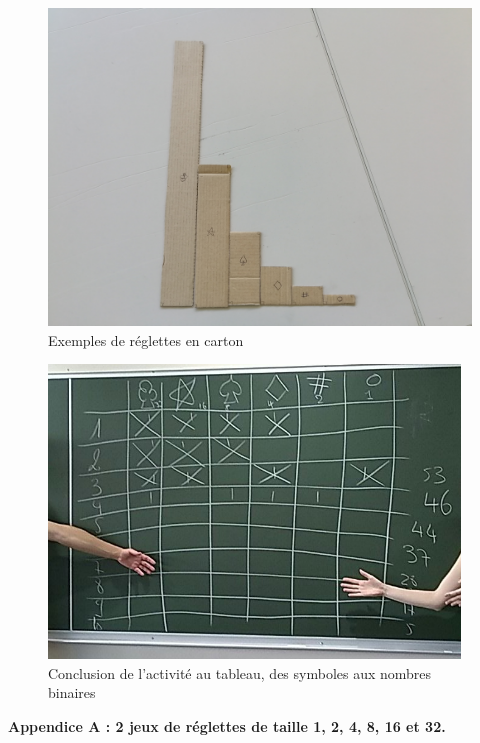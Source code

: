 \documentclass[a4paper,12pt]{scrartcl}
\begin{document}
\begin{figure}
\begin{center}
\includegraphics[width=0.7\linewidth]{images/reglettes.jpg} 
\end{center}
\caption{Exemples de réglettes en carton}
\label{fig:lettres}
\end{figure}

\begin{figure}
\begin{center}
\includegraphics[width=0.7\linewidth]{images/tableau.png}
\end{center}
\caption{Conclusion de l'activité au tableau, des symboles aux nombres binaires}
\label{fig:lettres}
\end{figure}

\appendix
\newpage
\thispagestyle{empty}
\bf{Appendice A :} 2 jeux de réglettes de taille 1, 2, 4, 8, 16 et 32.
\bigskip
\bigskip
~\\
\end{document}
